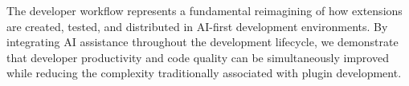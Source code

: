 The developer workflow represents a fundamental reimagining of how extensions are created, tested, and distributed in AI-first development environments. By integrating AI assistance throughout the development lifecycle, we demonstrate that developer productivity and code quality can be simultaneously improved while reducing the complexity traditionally associated with plugin development.
